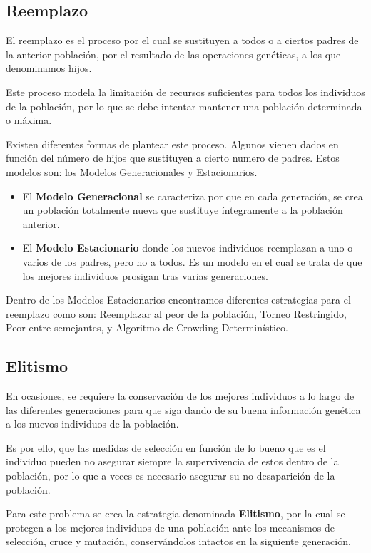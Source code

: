 \subsection{Reemplazo}

El reemplazo es el proceso por el cual se sustituyen a todos o a ciertos padres de la anterior población, por el resultado de las operaciones genéticas, a los que denominamos hijos.

Este proceso modela la limitación de recursos suficientes para todos los individuos de la población, por lo que se debe intentar mantener una población determinada o máxima.

Existen diferentes formas de plantear este proceso. Algunos vienen dados en función del número de hijos que sustituyen a cierto numero de padres. Estos modelos son: los Modelos Generacionales y Estacionarios.

\begin{itemize}
    \item El \textbf{Modelo Generacional} se caracteriza por que en cada generación, se crea un población totalmente nueva que sustituye íntegramente a la población anterior.
    \item El \textbf{Modelo Estacionario} donde los nuevos individuos reemplazan a uno o varios de los padres, pero no a todos. Es un modelo en el cual se trata de que los mejores individuos prosigan tras varias generaciones.
\end{itemize} 

Dentro de los Modelos Estacionarios encontramos diferentes estrategias para el reemplazo como son: Reemplazar al peor de la población, Torneo Restringido, Peor entre semejantes, y Algoritmo de Crowding Determinístico.

\subsection{Elitismo}

En ocasiones, se requiere la conservación de los mejores individuos a lo largo de las diferentes generaciones para que siga dando de su buena información genética a los nuevos individuos de la población.

Es por ello, que las medidas de selección en función de lo bueno que es el individuo pueden no asegurar siempre la supervivencia de estos dentro de la población, por lo que a veces es necesario asegurar su no desaparición de la población.

Para este problema se crea la estrategia denominada \textbf{Elitismo}, por la cual se protegen a los mejores individuos de una población ante los mecanismos de selección, cruce y mutación, conservándolos intactos en la siguiente generación.

